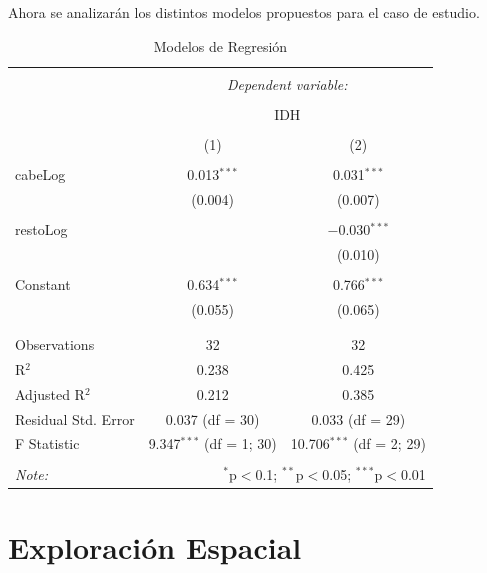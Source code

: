 \documentclass{article}
\begin{document}
Ahora se analizarán los distintos modelos propuestos para el caso de estudio.


\begin{table}[!htbp] \centering 
  \caption{Modelos de Regresión} 
  \label{regresiones} 
\begin{tabular}{@{\extracolsep{5pt}}lcc} 
\\[-1.8ex]\hline 
\hline \\[-1.8ex] 
 & \multicolumn{2}{c}{\textit{Dependent variable:}} \\ 
\cline{2-3} 
\\[-1.8ex] & \multicolumn{2}{c}{IDH} \\ 
\\[-1.8ex] & (1) & (2)\\ 
\hline \\[-1.8ex] 
 cabeLog & 0.013$^{***}$ & 0.031$^{***}$ \\ 
  & (0.004) & (0.007) \\ 
  & & \\ 
 restoLog &  & $-$0.030$^{***}$ \\ 
  &  & (0.010) \\ 
  & & \\ 
 Constant & 0.634$^{***}$ & 0.766$^{***}$ \\ 
  & (0.055) & (0.065) \\ 
  & & \\ 
\hline \\[-1.8ex] 
Observations & 32 & 32 \\ 
R$^{2}$ & 0.238 & 0.425 \\ 
Adjusted R$^{2}$ & 0.212 & 0.385 \\ 
Residual Std. Error & 0.037 (df = 30) & 0.033 (df = 29) \\ 
F Statistic & 9.347$^{***}$ (df = 1; 30) & 10.706$^{***}$ (df = 2; 29) \\ 
\hline 
\hline \\[-1.8ex] 
\textit{Note:}  & \multicolumn{2}{r}{$^{*}$p$<$0.1; $^{**}$p$<$0.05; $^{***}$p$<$0.01} \\ 
\end{tabular} 
\end{table} \clearpage
\section{Exploración Espacial}\label{exploracion}
\end{document}
